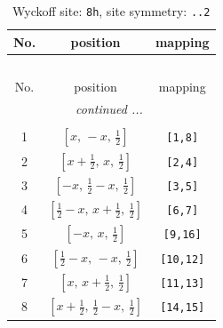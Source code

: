 \documentclass[fleqn,8pt]{jsarticle}
\begin{document}
\begin{longtable}{ccc}
\caption{Wyckoff site: {\tt 8h}, site symmetry: {\tt ..2}}
 \\
 \hline \hline
No. & position & mapping \\ \hline \endfirsthead

\multicolumn{2}{l}{\tablename\ \thetable{}} \\
 \hline \hline
No. & position & mapping \\ \hline \endhead

 \hline \hline
\multicolumn{2}{r}{\footnotesize\it continued ...} \\ \endfoot

 \hline \hline
\multicolumn{2}{r}{} \\ \endlastfoot

1 & $\left[ x,\, - x,\, \frac{1}{2} \right]$ & {\tt [1,8]} \\ \hline
2 & $\left[ x + \frac{1}{2},\, x,\, \frac{1}{2} \right]$ & {\tt [2,4]} \\ \hline
3 & $\left[ - x,\, \frac{1}{2} - x,\, \frac{1}{2} \right]$ & {\tt [3,5]} \\ \hline
4 & $\left[ \frac{1}{2} - x,\, x + \frac{1}{2},\, \frac{1}{2} \right]$ & {\tt [6,7]} \\ \hline
5 & $\left[ - x,\, x,\, \frac{1}{2} \right]$ & {\tt [9,16]} \\ \hline
6 & $\left[ \frac{1}{2} - x,\, - x,\, \frac{1}{2} \right]$ & {\tt [10,12]} \\ \hline
7 & $\left[ x,\, x + \frac{1}{2},\, \frac{1}{2} \right]$ & {\tt [11,13]} \\ \hline
8 & $\left[ x + \frac{1}{2},\, \frac{1}{2} - x,\, \frac{1}{2} \right]$ & {\tt [14,15]} \\
\end{longtable}
\renewcommand{\arraystretch}{1.2}
\end{document}
